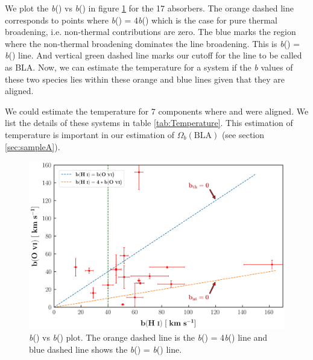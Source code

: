 We plot the \emph{b}() vs \emph{b}() in figure \ref{fig:bOVI_bHI} for the 17 absorbers. The orange dashed line corresponds to points where \emph{b}() = 4\emph{b}() which is the case for pure thermal broadening, i.e. non-thermal contributions are zero. The blue marks the region where the non-thermal broadening dominates the line broadening. This is \emph{b}() = \emph{b}() line. And vertical green dashed line marks our cutoff for the line to be called as BLA. Now, we can estimate the temperature for a system if the \emph{b} values of these two species lies within these orange and blue lines given that they are aligned.  

We could estimate the temperature for 7 components where  and  were aligned. We list the details of these systems in table \ref{tab:Temperature}. This estimation of temperature is important in our estimation of $\Omega_b(\text{BLA})$ (see section \ref{sec:sampleA}).

\begin{figure}
    \centering
    \includegraphics[width=\linewidth]{Figures/bHi_vs_BOvi.png}
    \caption{\emph{b}() vs \emph{b}() plot. The orange dashed line is the \emph{b}() = 4\emph{b}() line and blue dashed line shows the \emph{b}() = \emph{b}() line.}
    \label{fig:bOVI_bHI} 
\end{figure}



